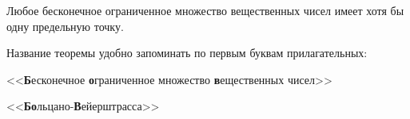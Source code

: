 \begin{teorema}\label{teorema_Bolcano-Veyershtrassa}

Любое бесконечное ограниченное множество вещественных чисел имеет хотя бы одну предельную точку.

\end{teorema}
\mnemo

Название теоремы удобно запоминать по первым буквам прилагательных:

<<\textbf{Б}есконечное \textbf{о}граниченное множество \textbf{в}ещественных чисел>>

<<\textbf{Бо}льцано-\textbf{В}ейерштрасса>>
